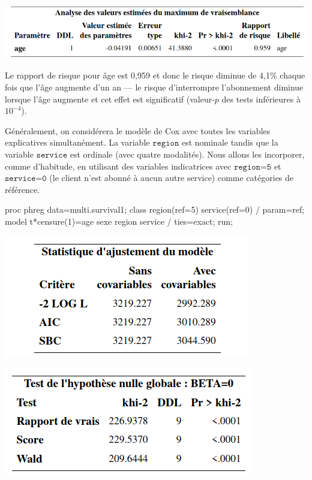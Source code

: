 \documentclass[
  11pt,
  letterpaper,
]{book}
\newenvironment{Shaded}{\begin{snugshade}}{\end{snugshade}}
\newcommand{\NormalTok}[1]{#1}
\theoremstyle{definition}
\theoremstyle{definition}
\theoremstyle{definition}
\theoremstyle{definition}
\theoremstyle{remark}
\begin{document}
\begin{center}\includegraphics[width=0.85\linewidth]{figures/05-survie-e14} \end{center}

Le rapport de risque pour âge est 0,959 et donc le risque diminue de 4,1\% chaque fois que l'âge augmente d'un an --- le risque d'interrompre l'abonnement diminue lorsque l'âge augmente et cet effet est significatif (valeur-\(p\) des tests inférieures à \(10^{-4}\)).

Généralement, on considérera le modèle de Cox avec toutes les variables explicatives simultanément. La variable \(\texttt{region}\) est nominale tandis que la variable \(\texttt{service}\) est ordinale (avec quatre modalités). Nous allons les incorporer, comme d'habitude, en utilisant des variables indicatrices avec \(\texttt{region=5}\) et \(\texttt{service=0}\) (le client n'est abonné à aucun autre service) comme catégories de référence.

\begin{Shaded}
\begin{Highlighting}[]
\NormalTok{proc phreg data=multi.survival1;}
\NormalTok{class region(ref=\textquotesingle{}5\textquotesingle{}) service(ref=\textquotesingle{}0\textquotesingle{}) / param=ref;}
\NormalTok{model t*censure(1)=age sexe region service / ties=exact; }
\NormalTok{run;}
\end{Highlighting}
\end{Shaded}

\begin{center}\includegraphics[width=0.45\linewidth]{figures/05-survie-e15} \end{center}

\begin{center}\includegraphics[width=0.45\linewidth]{figures/05-survie-e16} \end{center}
\end{document}
